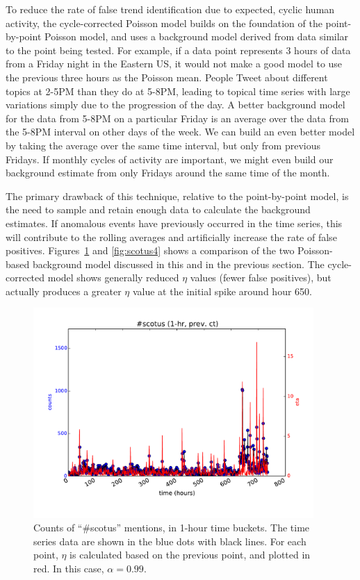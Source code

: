 \documentclass{article}
\begin{document}
To reduce the rate of false trend identification due to expected, cyclic human
activity, the cycle-corrected Poisson model builds on the foundation of the
point-by-point Poisson model, and uses a background model derived from data
similar to the point being tested. For example, if a data point represents 3
hours of data from a Friday night in the Eastern US, it would not make a good
model to use the previous three hours as the Poisson mean. People Tweet about
different topics at 2-5PM than they do at 5-8PM, leading to topical time series
with large variations simply due to the progression of the day. A better
background model for the data from 5-8PM on a particular Friday is an average
over the data from the 5-8PM interval on other days of the week. We can build
an even better model by taking the average over the same time interval, but
only from previous Fridays. If monthly cycles of activity are important, we
might even build our background estimate from only Fridays around the same time
of the month. 

The primary drawback of this technique, relative to the point-by-point model,
is the need to sample and retain enough data to calculate the background
estimates. If anomalous events have previously occurred in the time series,
this will contribute to the rolling averages and artificially increase the rate
of false positives. Figures~\ref{fig:scotus3} and \ref{fig:scotus4} shows a comparison of the two Poisson-based
background model discussed in this and in the previous section. The
cycle-corrected model shows generally reduced $\eta$ values (fewer false
positives), but actually produces a greater $\eta$ value at the initial spike
around hour 650. 

\begin{figure}
\begin{center}
\includegraphics[width=0.95\textwidth]{fig/scotus_1month_pbppm.pdf}
\caption{Counts of ``\#scotus'' mentions, in 1-hour time buckets. The time series
data are shown in the blue dots with black lines. For each point, $\eta$ is
calculated based on the previous point, and plotted in red. In this case, 
$\alpha=0.99$.} \label{fig:scotus3}
\end{center}
\end{figure}
\end{document}
